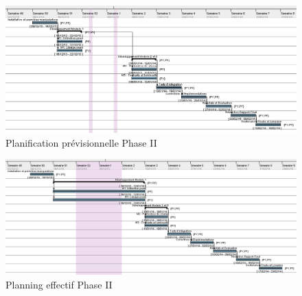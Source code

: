\documentclass[11pt, french,screen]{report-rd-info}
\begin{document}
\begin{figure}
	\centering
		\includegraphics[width=1\textwidth]{Gantts/p2_previsionnel}
	\caption{Planification prévisionnelle Phase II}
	\label{fig:PlanningPrevisionnel2}
\end{figure}
\begin{figure}
	\centering
		\includegraphics[width=1\textwidth]{Gantts/p2_effectif}
	\caption{Planning effectif Phase II}
	\label{fig:PlanningEffectif2}
\end{figure}
\end{document}

